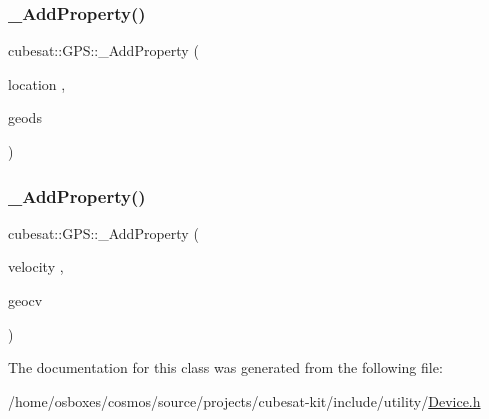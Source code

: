 \mbox{\label{classcubesat_1_1GPS_a66df85c7601286f73b82d561b0755686}} 
\subsubsection{\texorpdfstring{\+\_\+\+Add\+Property()}{\_AddProperty()}\hspace{0.1cm}{\footnotesize\ttfamily [8/9]}}
{\footnotesize\ttfamily cubesat\+::\+G\+P\+S\+::\+\_\+\+Add\+Property (\begin{DoxyParamCaption}\item[{location}]{,  }\item[{geods}]{ }\end{DoxyParamCaption})}

\mbox{\label{classcubesat_1_1GPS_a0e881f5aa0f080d69da97a0b03b35c5d}} 
\subsubsection{\texorpdfstring{\+\_\+\+Add\+Property()}{\_AddProperty()}\hspace{0.1cm}{\footnotesize\ttfamily [9/9]}}
{\footnotesize\ttfamily cubesat\+::\+G\+P\+S\+::\+\_\+\+Add\+Property (\begin{DoxyParamCaption}\item[{velocity}]{,  }\item[{geocv}]{ }\end{DoxyParamCaption})}



The documentation for this class was generated from the following file\+:\begin{DoxyCompactItemize}
\item 
/home/osboxes/cosmos/source/projects/cubesat-\/kit/include/utility/\hyperlink{Device_8h}{Device.\+h}\end{DoxyCompactItemize}
